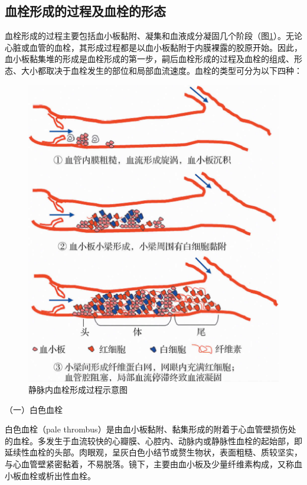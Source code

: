 \subsection{血栓形成的过程及血栓的形态}

血栓形成的过程主要包括血小板黏附、凝集和血液成分凝固几个阶段（图\ref{fig3-6}）。无论心脏或血管的血栓，其形成过程都是以血小板黏附于内膜裸露的胶原开始。因此，血小板黏集堆的形成是血栓形成的第一步，嗣后血栓形成的过程及血栓的组成、形态、大小都取决于血栓发生的部位和局部血流速度。血栓的类型可分为以下四种：

\begin{figure}[!htbp]
\centering
\includegraphics{./images/Image00039.jpg}
\caption{静脉内血栓形成过程示意图}
\label{fig3-6} 
\end{figure} 

{（一）白色血栓}

白色血栓（pale
thrombus）是由血小板黏附、黏集形成的附着于心血管壁损伤处的血栓。多发生于血流较快的心瓣膜、心腔内、动脉内或静脉性血栓的起始部，即延续性血栓的头部。肉眼观，呈灰白色小结节或赘生物状，表面粗糙、质较坚实，与心血管壁紧密黏着，不易脱落。镜下，主要由血小板及少量纤维素构成，又称血小板血栓或析出性血栓。

